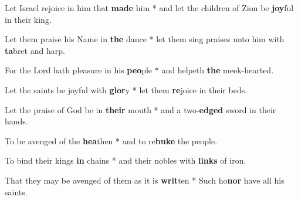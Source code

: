 \begin{multicols}{2}
	Let Israel rejoice in him that \textbf{made} him * and let the children of Zion be \textbf{joy}ful in their king.
	
	Let them praise his Name in \textbf{the} dance * let them sing praises unto him with \textbf{ta}bret and harp.
	
	For the Lord hath pleasure in his \textbf{peo}ple * and helpeth \textbf{the} meek-hearted.
	
	Let the saints be joyful with \textbf{glor}y * let them \textbf{re}joice in their beds.
	
	Let the praise of God be in \textbf{their} mouth * and a two-\textbf{edged} sword in their hands.
	
	To be avenged of the \textbf{hea}then * and to re\textbf{buke} the people.
	
	To bind their kings \textbf{in} chains * and their nobles with \textbf{links} of iron.
	
	That they may be avenged of them as it is \textbf{writ}ten * Such ho\textbf{nor} have all his saints.
\end{multicols}